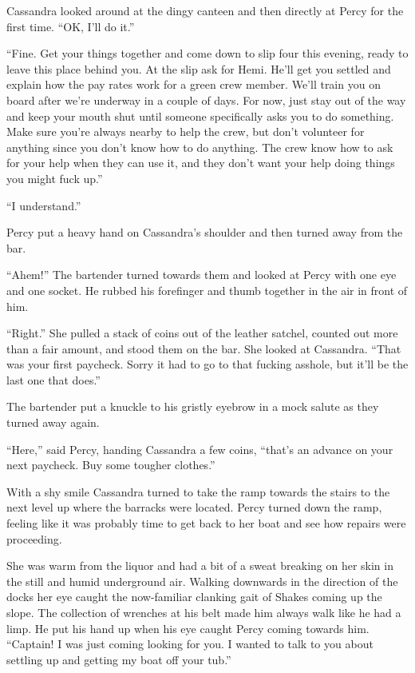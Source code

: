 \documentclass[
]{scrbook}
\begin{document}
Cassandra looked around at the dingy canteen and then directly at Percy
for the first time. ``OK, I'll do it.''

``Fine. Get your things together and come down to slip four this
evening, ready to leave this place behind you. At the slip ask for Hemi.
He'll get you settled and explain how the pay rates work for a green
crew member. We'll train you on board after we're underway in a couple
of days. For now, just stay out of the way and keep your mouth shut
until someone specifically asks you to do something. Make sure you're
always nearby to help the crew, but don't volunteer for anything since
you don't know how to do anything. The crew know how to ask for your
help when they can use it, and they don't want your help doing things
you might fuck up.''

``I understand.''

Percy put a heavy hand on Cassandra's shoulder and then turned away from
the bar.

``Ahem!'' The bartender turned towards them and looked at Percy with one
eye and one socket. He rubbed his forefinger and thumb together in the
air in front of him.

``Right.'' She pulled a stack of coins out of the leather satchel,
counted out more than a fair amount, and stood them on the bar. She
looked at Cassandra. ``That was your first paycheck. Sorry it had to go
to that fucking asshole, but it'll be the last one that does.''

The bartender put a knuckle to his gristly eyebrow in a mock salute as
they turned away again.

``Here,'' said Percy, handing Cassandra a few coins, ``that's an advance
on your next paycheck. Buy some tougher clothes.''

With a shy smile Cassandra turned to take the ramp towards the stairs to
the next level up where the barracks were located. Percy turned down the
ramp, feeling like it was probably time to get back to her boat and see
how repairs were proceeding.

\bigskip

She was warm from the liquor and had a bit of a sweat breaking on her
skin in the still and humid underground air. Walking downwards in the
direction of the docks her eye caught the now-familiar clanking gait of
Shakes coming up the slope. The collection of wrenches at his belt made
him always walk like he had a limp. He put his hand up when his eye
caught Percy coming towards him. ``Captain! I was just coming looking
for you. I wanted to talk to you about settling up and getting my boat
off your tub.''
\end{document}
